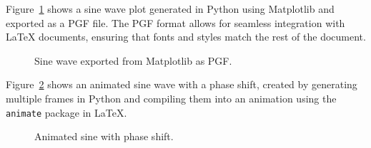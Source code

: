 \documentclass{article}
\begin{document}
    Figure~\ref{fig:sine-pgf} shows a sine wave plot generated in Python using Matplotlib and exported as a PGF file. The PGF format allows for seamless integration with LaTeX documents, ensuring that fonts and styles match the rest of the document.
    \begin{figure}[h]
        \centering
        \resizebox{\linewidth}{!}{}
        \caption{Sine wave exported from Matplotlib as PGF.}
        \label{fig:sine-pgf}
    \end{figure}

    \newpage
    Figure~\ref{fig:sine-anim} shows an animated sine wave with a phase shift, created by generating multiple frames in Python and compiling them into an animation using the \texttt{animate} package in LaTeX.
    \begin{figure}[h]
        \centering
        \caption{Animated sine with phase shift.}
        \label{fig:sine-anim}
    \end{figure}
\end{document}
